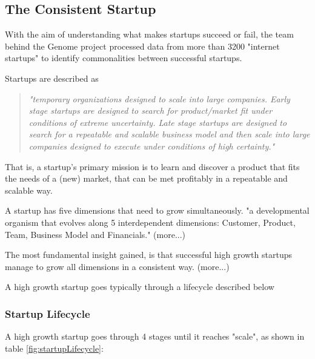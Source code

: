 \documentclass[a4paper,10pt]{article}
\begin{document}
\subsection{The Consistent Startup}
With the aim of understanding what makes startups succeed or fail, the team behind the Genome project processed
data from more than 3200 "internet startups" to identify commonalities between successful startups.

Startups are described as 
\begin{quote}
\emph{"temporary organizations designed to scale into large companies.
Early stage startups are designed to search for product/market fit under
conditions of extreme uncertainty. Late stage startups are designed to search for
a repeatable and scalable business model and then scale into large companies
designed to execute under conditions of high certainty."} \cite{genomePrematureScalingReport}
\end{quote}	
That is, a startup's primary mission is to learn and discover a product that fits the needs of a (new) market, 
that can be met profitably in a repeatable and scalable way.

A startup has five dimensions that need to grow simultaneously.
"a developmental organism that evolves along 5 interdependent dimensions: Customer, Product, Team, Business Model and Financials." \cite{genomePrematureScalingReport}
(more...)

The most fundamental insight gained, is that successful high growth startups manage to grow all dimensions in a consistent way.
(more...)

A high growth startup goes typically through a lifecycle \cite{genomePrematureScalingReport} described below

\subsubsection{Startup Lifecycle}
A high growth startup goes through 4 stages until it reaches "scale", as shown in table \ref{fig:startupLifecycle}:
\end{document}

